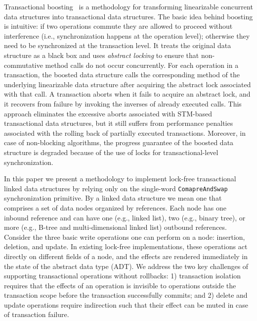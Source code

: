 \documentclass[10pt,conference,compsocconf]{IEEEtran}
\begin{document}
Transactional boosting~\cite{herlihy2008transactional} is a methodology for transforming linearizable concurrent data structures into transactional data structures.
The basic idea behind boosting is intuitive: if two operations commute they are allowed to proceed without interference (i.e., synchronization happens at the operation level); otherwise they need to be synchronized at the transaction level.
It treats the original data structure as a black box and uses \emph{abstract locking} to ensure that non-commutative method calls do not occur concurrently. 
For each operation in a transaction, the boosted data structure calls the corresponding method of the underlying linearizable data structure after acquiring the abstract lock associated with that call. 
A transaction aborts when it fails to acquire an abstract lock, and it recovers from failure by invoking the inverses of already executed calls. 
This approach eliminates the excessive aborts associated with STM-based transactional data structures, but it still suffers from performance penalties associated with the rolling back of partially executed transactions.
Moreover, in case of non-blocking algorithms, the progress guarantee of the boosted data structure is degraded because of the use of locks for transactional-level synchronization.
 
In this paper we present a methodology to implement lock-free transactional linked data structures by relying only on the single-word \texttt{ComapreAndSwap} synchronization primitive.
By a linked data structure we mean one that comprises a set of data nodes organized by references. 
Each node has one inbound reference and can have one (e.g., linked list), two (e.g., binary tree), or more (e.g., B-tree and multi-dimensional linked list) outbound references.
Consider the three basic write operations one can perform on a node: insertion, deletion, and update.
In existing lock-free implementations, these operations act directly on different fields of a node, and the effects are rendered immediately in the state of the abstract data type (ADT).
We address the two key challenges of supporting transactional operations without rollbacks: 1) transaction isolation requires that the effects of an operation is invisible to operations outside the transaction scope before the transaction successfully commits; and 2) delete and update operations require indirection such that their effect can be muted in case of transaction failure.
\end{document}
